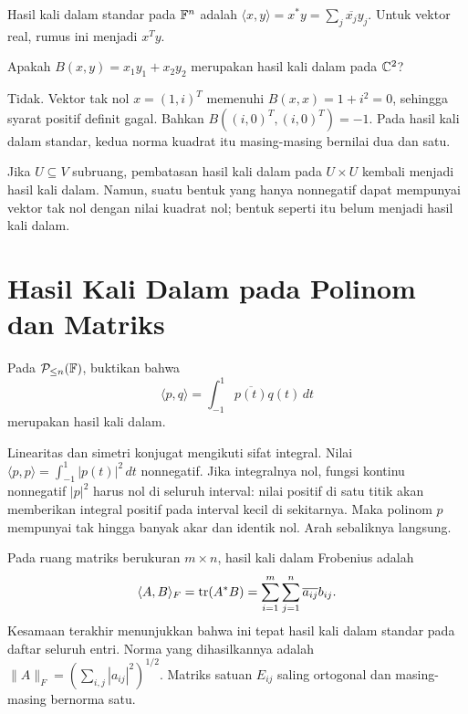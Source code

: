 Hasil kali dalam standar pada $\mathbb{F}^n$ adalah
$\langle x,y\rangle=x^*y=\sum_j\overline{x_j}y_j$.
Untuk vektor real, rumus ini menjadi $x^Ty$.

\begin{exam}
    Apakah $B(x,y)=x_1y_1+x_2y_2$ merupakan hasil kali dalam
    pada $\mathbb{C}^2$?
\end{exam}
\begin{solution}
    Tidak. Vektor tak nol $x=(1,i)^T$ memenuhi
    $B(x,x)=1+i^2=0$, sehingga syarat positif definit gagal.
    Bahkan $B((i,0)^T,(i,0)^T)=-1$.
    Pada hasil kali dalam standar, kedua norma kuadrat itu
    masing-masing bernilai dua dan satu.
\end{solution}

Jika $U\subseteq V$ subruang, pembatasan hasil kali dalam pada
$U\times U$ kembali menjadi hasil kali dalam. Namun, suatu
bentuk yang hanya nonnegatif dapat mempunyai vektor tak nol
dengan nilai kuadrat nol; bentuk seperti itu belum menjadi hasil kali dalam.

\section{Hasil Kali Dalam pada Polinom dan Matriks}

\begin{exam}
    Pada $\mathcal P_{\le n}(\mathbb{F})$, buktikan bahwa
    \[
        \langle p,q\rangle=\int_{-1}^{1}\overline{p(t)}q(t)\,dt
    \]
    merupakan hasil kali dalam.
\end{exam}
\begin{solution}
    Linearitas dan simetri konjugat mengikuti sifat integral.
    Nilai $\langle p,p\rangle=\int_{-1}^1|p(t)|^2\,dt$ nonnegatif.
    Jika integralnya nol, fungsi kontinu nonnegatif $|p|^2$
    harus nol di seluruh interval: nilai positif di satu titik
    akan memberikan integral positif pada interval kecil di sekitarnya.
    Maka polinom $p$ mempunyai tak hingga banyak akar dan identik nol.
    Arah sebaliknya langsung.
\end{solution}

Pada ruang matriks berukuran $m\times n$, hasil kali dalam Frobenius adalah
\[
    \langle A,B\rangle_F=\operatorname{tr}(A^*B)
      =\sum_{i=1}^m\sum_{j=1}^n\overline{a_{ij}}b_{ij}.
\]
Kesamaan terakhir menunjukkan bahwa ini tepat hasil kali dalam
standar pada daftar seluruh entri. Norma yang dihasilkannya adalah
$\|A\|_F=(\sum_{i,j}|a_{ij}|^2)^{1/2}$.
Matriks satuan $E_{ij}$ saling ortogonal dan masing-masing bernorma satu.

